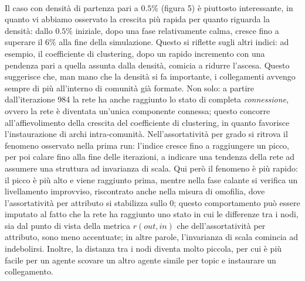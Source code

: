 \documentclass[a4paper,12pt]{article}
\begin{document}
\\Il caso con densità di partenza pari a $0.5\%$ (figura 5) è piuttosto interessante, in quanto vi abbiamo osservato la crescita più rapida per quanto riguarda la densità: dallo $0.5\%$ iniziale, dopo una fase relativamente calma, cresce fino a superare il $6\%$ alla fine della simulazione. Questo si riflette sugli altri indici: ad esempio, il coefficiente di clustering, dopo un rapido incremento con una pendenza pari a quella assunta dalla densità, comicia a ridurre l'ascesa. Questo suggerisce che, man mano che la densità si fa importante, i collegamenti avvengo sempre di più all'interno di comunità già formate. Non solo: a partire dall'iterazione 984 la rete ha anche raggiunto lo stato di completa \textit{connessione}, ovvero la rete è diventata un'unica componente connessa; questo concorre all'affievolimento della crescita del coefficiente di clustering, in quanto favorisce l'instaurazione di archi intra-comunità. Nell'assortatività per grado si ritrova il fenomeno osservato nella prima run: l'indice cresce fino a raggiungere un picco, per poi calare fino alla fine delle iterazioni, a indicare una tendenza della rete ad assumere una struttura ad invarianza di scala. Qui però il fenomeno è più rapido: il picco è più alto e viene raggiunto prima, mentre nella fase calante si verifica un livellamento improvviso, riscontrato anche nella misura di omofilia, dove l'assortatività per attributo si stabilizza sullo 0; questo comportamento può essere imputato al fatto che la rete ha raggiunto uno stato in cui le differenze tra i nodi, sia dal punto di vista della metrica $r(out,in)$ che dell'assortatività per attributo, sono meno accentuate; in altre parole, l'invarianza di scala comincia ad indebolirsi. Inoltre, la distanza tra i nodi diventa molto piccola, per cui è più facile per un agente scovare un altro agente simile per topic e instaurare un collegamento. 
\end{document}
